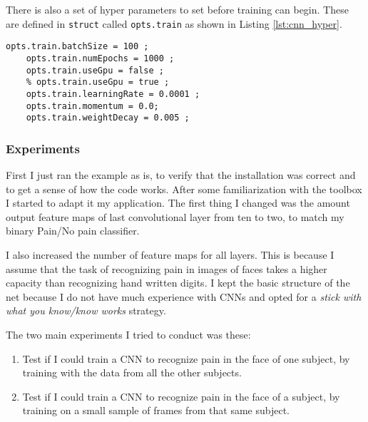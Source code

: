 \documentclass[Main]{subfiles}
\begin{document}
			There is also a set of hyper parameters to set before training can begin.
			These are defined in \texttt{struct} called \texttt{opts.train} as shown in Listing \ref{lst:cnn_hyper}.

			\newpage
			\begin{lstlisting}[caption=CNN setup hyper parameters, style=Code-Matlab, label=lst:cnn_hyper]
	opts.train.batchSize = 100 ;
	opts.train.numEpochs = 1000 ;
	opts.train.useGpu = false ;
	% opts.train.useGpu = true ;
	opts.train.learningRate = 0.0001 ;
	opts.train.momentum = 0.0;
	opts.train.weightDecay = 0.005 ;
			\end{lstlisting}

		
		\subsubsection{Experiments} %
			\label{ssub:experiments}
			First I just ran the example as is, to verify that the installation was correct and to get a sense of how the code works.
			After some familiarization with the toolbox I started to adapt it my application.
			The first thing I changed was the amount output feature maps of last convolutional layer from ten to two, to match my binary Pain/No pain classifier.

			I also increased the number of feature maps for all layers.
			This is because I assume that the task of recognizing pain in images of faces takes a higher capacity than recognizing hand written digits.
			I kept the basic structure of the net because I do not have much experience with CNNs and opted for a \emph{stick with what you know/know works} strategy.

			The two main experiments I tried to conduct was these:
			\begin{enumerate}
				\item
				Test if I could train a CNN to recognize pain in the face of one subject, by training with the data from all the other subjects.

				\item
				Test if I could train a CNN to recognize pain in the face of a subject, by training on a small sample of frames from that same subject.
			\end{enumerate}
			

	
\end{document}
